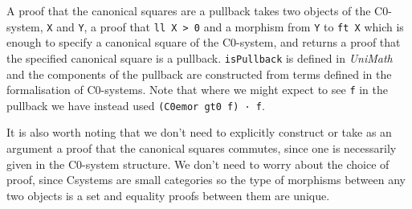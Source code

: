 A proof that the canonical squares are a pullback takes two objects of the
C0-system, \lstinline|X| and \lstinline|Y|, a proof that \lstinline|ll X > 0| and a morphism
from \lstinline|Y| to \lstinline|ft X| which is enough to specify a canonical square of
the C0-system, and returns a proof that the specified canonical square is a
pullback. \lstinline|isPullback| is defined in \textit{UniMath} and the components of
the pullback are constructed from terms defined in the formalisation of
C0-systems. Note that where we might expect to see \lstinline|f| in the pullback we
have instead used \lstinline|(C0emor gt0 f) · f|.

It is also worth noting that we don't need to explicitly construct or take as an
argument a proof that the canonical squares commutes, since one is necessarily
given in the C0-system structure. We don't need to worry about the choice of
proof, since Csystems are small categories so the type of morphisms between any
two objects is a set and equality proofs between them are unique.